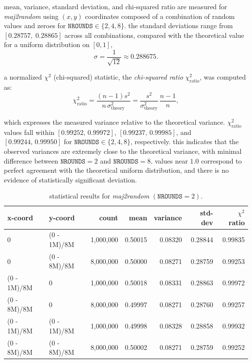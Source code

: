 \documentclass{scrartcl}
\begin{document}
\noindent
mean, variance, standard deviation, and chi-squared ratio are measured for
\emph{maj2random} using $(x,y)$ coordinates composed of a combination of
random values and zeroes for $\mathtt{NROUNDS} \in \{2, 4, 8\}$. the standard
deviations range from $[0.28757,\; 0.28865]$ across all combinations,
compared with the theoretical value for a uniform distribution on \([0,1]\),
\[
  \sigma = \frac{1}{\sqrt{12}} \approx 0.288675.
\]

\vspace{1em}

\noindent
a normalized $\chi^2$ (chi-squared) statistic, the \emph{chi-squared ratio}
$\chi^2_\mathrm{ratio}$, was computed as:
\[
  \chi^2_\mathrm{ratio} = \frac{(n-1)s^2}{n\,\sigma^2_\mathrm{theory}} =
    \frac{s^2}{\sigma^2_\mathrm{theory}} \, \frac{n-1}{n},
\]

\vspace{1em}

\noindent
which expresses the measured variance relative to the theoretical variance.
$\chi^2_\mathrm{ratio}$ values fall within  $[0.99252,\,0.99972]$,
$[0.99237,\,0.99985]$, and $[0.99244,\,0.99950]$  for $\mathtt{NROUNDS}
\in \{2, 4, 8\}$, respectively. this indicates that the  observed variances
are extremely close to the theoretical variance, with minimal difference
between $\mathtt{NROUNDS}=2$ and $\mathtt{NROUNDS}=8$. values near $1.0$
correspond to perfect agreement with the theoretical uniform distribution,
and there is no evidence of statistically significant deviation.
\newpage

\begin{table}[h]
\centering
\small
\begin{tabular}{llrrrrr}
\hline
\textbf{x-coord} & \textbf{y-coord} & \textbf{count} & \textbf{mean} &
\textbf{variance} & \textbf{std-dev} & \textbf{$\chi^2$ ratio} \\
\hline
          0 & (0 - 1M)/8M  & 1,000,000 & 0.50015 & 0.08320 & 0.28844 & 0.99835 \\
          0 & (0 - 8M)/8M  & 8,000,000 & 0.50000 & 0.08271 & 0.28759 & 0.99253 \\
(0 - 1M)/8M &           0  & 1,000,000 & 0.50018 & 0.08331 & 0.28863 & 0.99972 \\
(0 - 8M)/8M &           0  & 8,000,000 & 0.49997 & 0.08271 & 0.28760 & 0.99257 \\
(0 - 1M)/8M & (0 - 1M)/8M  & 1,000,000 & 0.49998 & 0.08328 & 0.28858 & 0.99932 \\
(0 - 8M)/8M & (0 - 8M)/8M  & 8,000,000 & 0.50002 & 0.08271 & 0.28759 & 0.99252 \\
\hline
\end{tabular}
\caption{statistical results for \emph{maj2random} $(\mathtt{NROUNDS}=2)$.}
\end{table}
\end{document}
